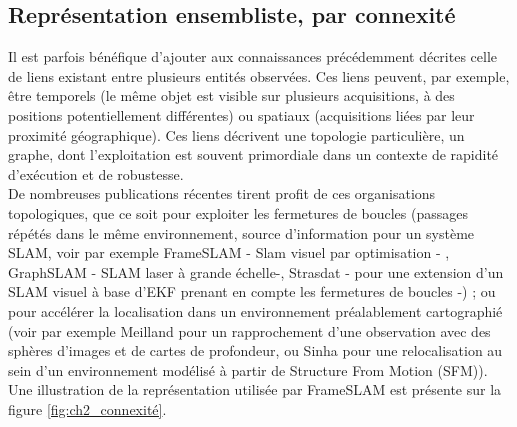 \subsection{Représentation ensembliste, par connexité}
Il est parfois bénéfique d'ajouter aux connaissances précédemment décrites celle de liens existant entre plusieurs entités observées. Ces liens peuvent, par exemple, être temporels (le même objet est visible sur plusieurs acquisitions, à des positions potentiellement différentes) ou spatiaux (acquisitions liées par leur proximité géographique). Ces liens décrivent une topologie particulière, un graphe, dont l'exploitation est souvent primordiale dans un contexte de rapidité d'exécution et de robustesse.\\
De nombreuses publications récentes tirent profit de ces organisations topologiques, que ce soit pour exploiter les fermetures de boucles (passages répétés dans le même environnement, source d'information pour un système SLAM, voir par exemple FrameSLAM \cite{Konolige2008} - Slam visuel par optimisation - , GraphSLAM \cite{Thrun2006a} - SLAM laser à grande échelle-, Strasdat \cite{Strasdat} - pour une extension d'un SLAM visuel à base d'EKF prenant en compte les fermetures de boucles -) ; ou pour accélérer la localisation dans un environnement préalablement cartographié (voir par exemple Meilland \cite{Meilland2011} pour un rapprochement d'une observation avec des sphères d'images et de cartes de profondeur, ou Sinha \cite{Sinha2012} pour une relocalisation au sein d'un environnement modélisé à partir de \og Structure From Motion\fg{} (SFM)). Une illustration de la représentation utilisée par FrameSLAM est présente sur la figure \ref{fig:ch2_connexité}.

